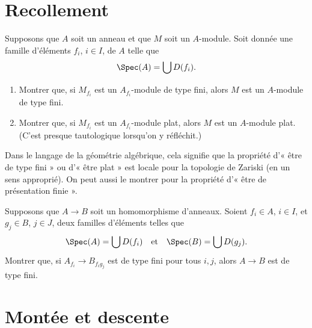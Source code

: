 \section{Recollement}
\label{section-glueing}

\begin{exercise}
\label{exercise-cover}
Supposons que $A$ soit un anneau et que $M$ soit un $A$-module.
Soit donnée une famille d'éléments $f_i$, $i \in I$, de $A$ telle que
$$
\Spec(A) = \bigcup D(f_i).
$$
\begin{enumerate}
\item Montrer que, si $M_{f_i}$ est un $A_{f_i}$-module de type fini,
alors $M$ est un $A$-module de type fini.
\item Montrer que, si $M_{f_i}$ est un $A_{f_i}$-module plat,
alors $M$ est un $A$-module plat.
(C'est presque tautologique lorsqu'on y réfléchit.)
\end{enumerate}
\end{exercise}

\begin{remark}
\label{remark-cover}
Dans le langage de la géométrie algébrique, cela signifie que la propriété
d'« être de type fini » ou d'« être plat » est locale pour la topologie de Zariski
(en un sens approprié). On peut aussi le montrer pour la propriété
d'« être de présentation finie ».
\end{remark}

\begin{exercise}
\label{exercise-cover-ring-map}
Supposons que $A \to B$ soit un homomorphisme d'anneaux.
Soient $f_i \in A$, $i \in I$, et $g_j \in B$, $j \in J$, deux familles
d'éléments telles que
$$
\Spec(A) = \bigcup D(f_i)
\quad\text{et}\quad
\Spec(B) = \bigcup D(g_j).
$$
Montrer que, si $A_{f_i} \to B_{f_ig_j}$ est de type fini pour tous $i, j$,
alors $A \to B$ est de type fini.
\end{exercise}




\section{Montée et descente}
\label{section-going-up}


